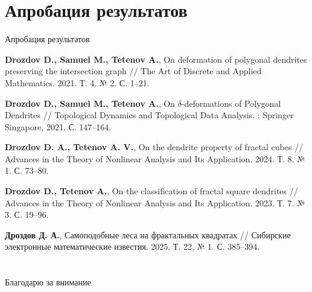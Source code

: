 \documentclass[aspectratio=1610, 10pt, notheorems]{beamer}
\begin{document}
\section{Апробация результатов}
\begin{frame}{Апробация результатов}

{\normalsize
\begin{thebibliography}{9}
{\small
{}
{\bf Drozdov D., Samuel M., Tetenov A.},
On deformation of polygonal dendrites preserving the intersection graph //
The Art of Discrete and Applied Mathematics. 2021. Т. 4. № 2. С. 1--21.

{\bf Drozdov D., Samuel M., Tetenov A.}, 
On $\delta$-deformations of Polygonal Dendrites // 
Topological Dynamics and Topological Data Analysis. : Springer Singapore, 2021. С. 147--164.

{\bf Drozdov D. A., Tetenov A. V.}, On the dendrite property of fractal cubes // Advances in the Theory of Nonlinear Analysis and Its Application. 2024. Т. 8. № 1. С. 73--80.

{\bf Drozdov D., Tetenov A.}, 
On the classification of fractal square dendrites // 
Advances in the Theory of Nonlinear Analysis and Its Application. 2023. Т. 7. № 3. С. 19--96.

{\bf Дроздов Д. А.}, 
Самоподобные леса на фрактальных квадратах // Сибирские электронные математические известия. 2025. Т. 22, № 1. С. 385--394.}
\end{thebibliography}}
\end{frame}

\section{}
\begin{frame}{}
\begin{center}
\Huge Благодарю за внимание
\end{center}
\end{frame}
\end{document}
